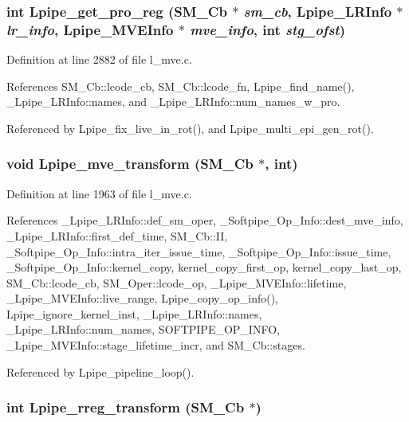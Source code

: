 \subsubsection{\setlength{\rightskip}{0pt plus 5cm}int Lpipe\_\-get\_\-pro\_\-reg (\bf{SM\_\-Cb} $\ast$ {\em sm\_\-cb}, \bf{Lpipe\_\-LRInfo} $\ast$ {\em lr\_\-info}, \bf{Lpipe\_\-MVEInfo} $\ast$ {\em mve\_\-info}, int {\em stg\_\-ofst})}\label{l__mve_8h_bc251ae063227ad587bde4091a7a8a7a}




Definition at line 2882 of file l\_\-mve.c.

References SM\_\-Cb::lcode\_\-cb, SM\_\-Cb::lcode\_\-fn, Lpipe\_\-find\_\-name(), \_\-Lpipe\_\-LRInfo::names, and \_\-Lpipe\_\-LRInfo::num\_\-names\_\-w\_\-pro.

Referenced by Lpipe\_\-fix\_\-live\_\-in\_\-rot(), and Lpipe\_\-multi\_\-epi\_\-gen\_\-rot().
\subsubsection{\setlength{\rightskip}{0pt plus 5cm}void Lpipe\_\-mve\_\-transform (\bf{SM\_\-Cb} $\ast$, int)}\label{l__mve_8h_250b56a32209a80f0e5258af0a8a28b1}




Definition at line 1963 of file l\_\-mve.c.

References \_\-Lpipe\_\-LRInfo::def\_\-sm\_\-oper, \_\-Softpipe\_\-Op\_\-Info::dest\_\-mve\_\-info, \_\-Lpipe\_\-LRInfo::first\_\-def\_\-time, SM\_\-Cb::II, \_\-Softpipe\_\-Op\_\-Info::intra\_\-iter\_\-issue\_\-time, \_\-Softpipe\_\-Op\_\-Info::issue\_\-time, \_\-Softpipe\_\-Op\_\-Info::kernel\_\-copy, kernel\_\-copy\_\-first\_\-op, kernel\_\-copy\_\-last\_\-op, SM\_\-Cb::lcode\_\-cb, SM\_\-Oper::lcode\_\-op, \_\-Lpipe\_\-MVEInfo::lifetime, \_\-Lpipe\_\-MVEInfo::live\_\-range, Lpipe\_\-copy\_\-op\_\-info(), Lpipe\_\-ignore\_\-kernel\_\-inst, \_\-Lpipe\_\-LRInfo::names, \_\-Lpipe\_\-LRInfo::num\_\-names, SOFTPIPE\_\-OP\_\-INFO, \_\-Lpipe\_\-MVEInfo::stage\_\-lifetime\_\-incr, and SM\_\-Cb::stages.

Referenced by Lpipe\_\-pipeline\_\-loop().
\subsubsection{\setlength{\rightskip}{0pt plus 5cm}int Lpipe\_\-rreg\_\-transform (\bf{SM\_\-Cb} $\ast$)}\label{l__mve_8h_651dce08e6f236c3d39eb2f7f276d6cb}




